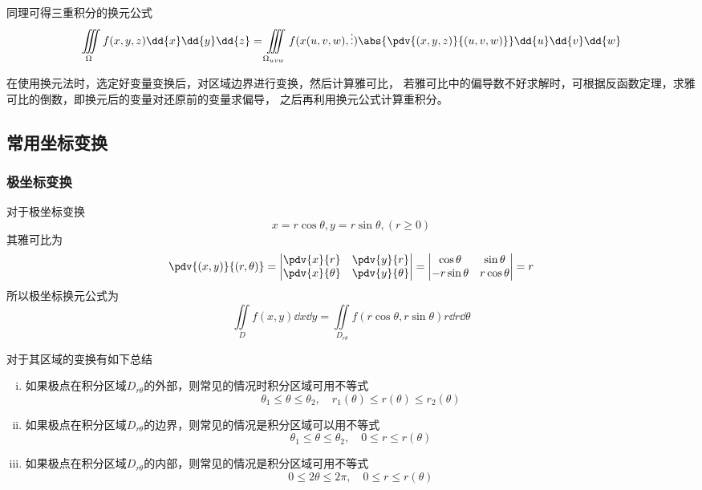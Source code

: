 同理可得三重积分的换元公式
\begin{equation}
    \iiint\limits_\Omega f(x,y,z)\dd{x}\dd{y}\dd{z} = \iiint\limits_{\Omega_{uvw}} f(x(u,v,w),\vdots)\abs{\pdv{(x,y,z)}{(u,v,w)}}\dd{u}\dd{v}\dd{w}
\end{equation}

在使用换元法时，选定好变量变换后，对区域边界进行变换，然后计算雅可比，
若雅可比中的偏导数不好求解时，可根据反函数定理，求雅可比的倒数，即换元后的变量对还原前的变量求偏导，
之后再利用换元公式计算重积分。

\subsection{常用坐标变换}
\subsubsection{极坐标变换}
对于极坐标变换
\[ x = r\cos\theta, y = r\sin\theta, (r \geq 0) \]
其雅可比为
\[
    \pdv{(x,y)}{(r,\theta)} =
    \begin{vmatrix}
        \pdv{x}{r}      & \pdv{y}{r}      \\
        \pdv{x}{\theta} & \pdv{y}{\theta}
    \end{vmatrix}
    =
    \begin{vmatrix}
        \cos\theta   & \sin\theta  \\
        -r\sin\theta & r\cos\theta
    \end{vmatrix}
    =
    r
\]
所以极坐标换元公式为
\begin{equation}
    \iint\limits_D f(x,y)\dd{x}\dd{y} = \iint\limits_{D_{r\theta}} f(r\cos\theta, r\sin\theta) r\dd{r}\dd{\theta}
\end{equation}

对于其区域的变换有如下总结
\begin{enumerate}[(i)]
    \item 如果极点在积分区域$D_{r\theta}$的外部，则常见的情况时积分区域可用不等式
          \[ \theta_1 \leq \theta \leq \theta_2, \quad r_1(\theta) \leq r(\theta) \leq r_2(\theta) \]
    \item 如果极点在积分区域$D_{r\theta}$的边界，则常见的情况是积分区域可以用不等式
          \[ \theta_1 \leq \theta \leq \theta_2,\quad 0 \leq r \leq r(\theta) \]
    \item 如果极点在积分区域$D_{r\theta}$的内部，则常见的情况是积分区域可用不等式
          \[ 0\leq 2\theta \leq 2\pi,\quad 0\leq r\leq r(\theta) \]
\end{enumerate}

